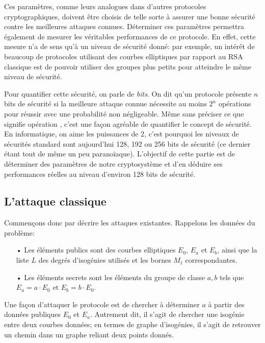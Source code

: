 \documentclass[11pt,a4paper]{article}
\renewcommand{\v}{\vspace{5mm}}
\theoremstyle{definition}
\begin{document}
Ces paramètres, comme leurs analogues dans d'autres protocoles cryptographiques, doivent être choisis de telle sorte à assurer une bonne sécurité contre les meilleures attaques connues. Déterminer ces paramètres permettra également de mesurer les véritables performances de ce protocole. En effet, cette mesure n'a de sens qu'à un niveau de sécurité donné: par exemple, un intérêt de beaucoup de protocoles utilisant des courbes elliptiques par rapport au RSA classique est de pouvoir utiliser des groupes plus petits pour atteindre le même niveau de sécurité.

\v
Pour quantifier cette sécurité, on parle de \emph{bits}. On dit qu'un protocole présente $n$ bits de sécurité si la meilleure attaque connue nécessite au moins $2^n$ opérations pour réussir avec une probabilité non négligeable. Même sans préciser ce que signifie \og opération \fg, c'est une façon agréable de quantifier le concept de sécurité. En informatique, on aime les puissances de 2, c'est pourquoi les niveaux de sécurités standard sont aujourd'hui 128, 192 ou 256 bits de sécurité (ce dernier étant tout de même un peu paranoïaque). L'objectif de cette partie est de déterminer des paramètres de notre cryptosystème et d'en déduire ses performances réelles au niveau d'environ 128 bits de sécurité.


\subsection{L'attaque classique}

Commençons donc par décrire les attaques existantes. Rappelons les données du problème:
\begin{itemize}
\item[•] Les éléments publics sont des courbes elliptiques $E_0$, $E_a$ et $E_b$, ainsi que la liste $L$ des degrés d'isogénies utilisés et les bornes $M_\ell$ correspondantes.
\item[•] Les éléments secrets sont les éléments du groupe de classe $a, b$ tels que $E_a = a\cdot E_0$ et $E_b = b\cdot E_0$.
\end{itemize}

Une façon d'attaquer le protocole est de chercher à déterminer $a$ à partir des données publiques $E_0$ et $E_a$. Autrement dit, il s'agit de chercher une isogénie entre deux courbes données; en termes de graphe d'isogénies, il s'agit de retrouver un chemin dans un graphe reliant deux points donnés.
\end{document}
